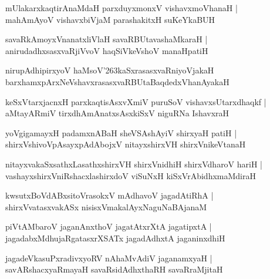 \documentclass[twoside,12pt,openright]{book}
\def\S{\char'263}
\newcounter{shloka}[chapter]
\begin{document}
\begin{shloka}%
mUlakarxkaqtirAnaMdaH parxduyxmonxV vishavxmoVhanaH |\\
mahAmAyoV vishavxbiVjaM parashakitxH suKeYkaBUH
\end{shloka}

\begin{shloka}%
savaRkAmoyxVnanatxliVlaH savaRBUtavashaMkaraH |\\
anirudadhxsasxvaRjiVvoV haqSiVkeVshoV manaHpatiH 
\end{shloka}

\begin{shloka}%
nirupAdhipirxyoV haMsoV\S kaSxrasasxvaRniyoVjakaH \\
barxhamxpArxNeVshavxrasasxvaRBUtaBaqdedxVhanAyakaH 
\end{shloka}

\begin{shloka}%
keSxVtarxjacnxH parxkaqtisAsxvXmiV puruSoV vishavxsUtarxdhaqkf |\\
aMtayARmiV tirxdhAmAnatxsAsxkiSxV niguRNa IshavxraH 
\end{shloka}

\begin{shloka}%
yoVgigamayxH padamxnABaH sheVSAshAyiV shirxyaH patiH |\\
shirxVshivoVpAsayxpAdAbojxV nitayxshirxVH shirxVnikeVtanaH 
\end{shloka}

\begin{shloka}%
nitayxvakaSxsathxLasathxshirxVH shirxVnidhiH shirxVdharoV hariH |\\
vashayxshirxVniRshacxlashirxdoV viSuNxH kiSxVrAbidhxmaMdiraH
\end{shloka}

\begin{shloka}%
kwsutxBoVdABxsitoVrasokxV mAdhavoV jagadAtiRhA |\\
shirxVvatasxvakASx nisisxVmakalAyxNaguNaBAjanaM 
\end{shloka}

\begin{shloka}%
piVtAMbaroV jaganAnxthoV jagatAtxrXtA jagatipxtA |\\
jagadabxMdhujaRgatasxrXSATx jagadAdhxtA jaganinxdhiH 
\end{shloka}

\begin{shloka}%
jagadeVkasuPxradivxyoRV nAhaMvAdiV jaganamxyaH |\\
savARshacxyaRmayaH savaRsidAdhxthaRH savaRraMjitaH 
\end{shloka}
\end{document}
